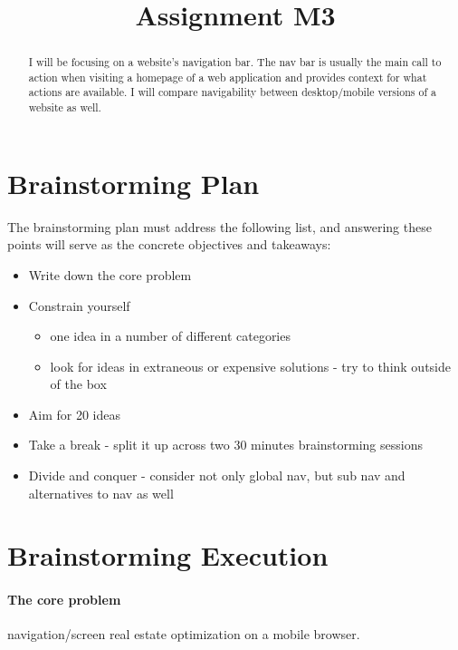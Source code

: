 

\title{Assignment M3\\}



\maketitle
\thispagestyle{fancy}

\begin{abstract}
I will be focusing on a website’s navigation bar. The nav bar is usually the main call to action when visiting a homepage of a web application and provides context for what actions are available. I will compare navigability between desktop/mobile versions of a website as well.
\end{abstract}


\section{Brainstorming Plan}
The brainstorming plan must address the following list, and answering these points will serve as the concrete objectives and takeaways:

\begin{itemize}
\item
  Write down the core problem
\item
  Constrain yourself
  \begin{itemize}
  \item
    one idea in a number of different categories
  \item
    look for ideas in extraneous or expensive solutions - try to think outside of the box
  \end{itemize}
\item
  Aim for 20 ideas
\item
  Take a break - split it up across two 30 minutes brainstorming sessions
\item
  Divide and conquer - consider not only global nav, but sub nav and alternatives to nav as well
\end{itemize}


\section{Brainstorming Execution}
\paragraph{The core problem} navigation/screen real estate optimization on a mobile browser.

